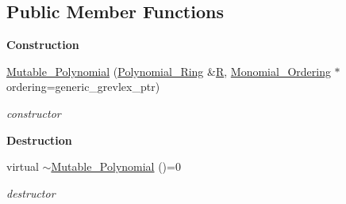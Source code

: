 \subsection*{Public Member Functions}
\begin{Indent}\textbf{ Construction}\par
\begin{DoxyCompactItemize}
\item 
\mbox{\label{class_mutable___polynomial_a4dd2f3f6a5e95505a7ca88e976ab62d2}} 
\hyperlink{class_mutable___polynomial_a4dd2f3f6a5e95505a7ca88e976ab62d2}{Mutable\+\_\+\+Polynomial} (\hyperlink{class_polynomial___ring}{Polynomial\+\_\+\+Ring} \&\hyperlink{class_abstract___polynomial_a551ade20b7dcd96c227dd0401f6ffbbe}{R}, \hyperlink{class_monomial___ordering}{Monomial\+\_\+\+Ordering} $\ast$ordering=generic\+\_\+grevlex\+\_\+ptr)
\begin{DoxyCompactList}\small\item\em constructor \end{DoxyCompactList}\end{DoxyCompactItemize}
\end{Indent}
\begin{Indent}\textbf{ Destruction}\par
\begin{DoxyCompactItemize}
\item 
\mbox{\label{class_mutable___polynomial_ad81cb5bb2a87a289c73fb6cd39afa029}} 
virtual \hyperlink{class_mutable___polynomial_ad81cb5bb2a87a289c73fb6cd39afa029}{$\sim$\+Mutable\+\_\+\+Polynomial} ()=0
\begin{DoxyCompactList}\small\item\em destructor \end{DoxyCompactList}\end{DoxyCompactItemize}
\end{Indent}
